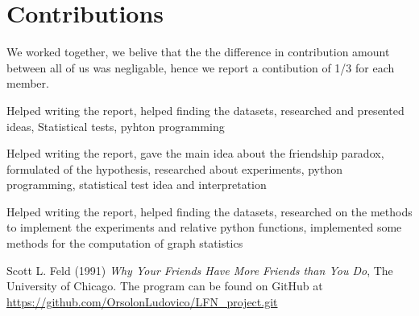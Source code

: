 \documentclass{article}
\begin{document}
\section*{Contributions}
We worked together, we belive that the the difference in contribution amount between all of us was negligable, hence we report a contibution of 1/3 for each member.
\begin{description}[font=\normalfont\itshape]
    \item[Lavorati Ippolito:] Helped writing the report, helped finding the datasets, researched and presented ideas, Statistical tests, pyhton programming
    \item[Orsolon Ludovico:] Helped writing the report, gave the main idea about the friendship paradox, formulated of the hypothesis, researched about experiments, python programming, statistical test idea and interpretation
    \item[Stefani Patrizia:] Helped writing the report, helped finding the datasets, researched on the methods to implement the experiments and relative python functions, implemented some methods for the computation of graph statistics
\end{description}
\begin{thebibliography}{9}
Scott L. Feld (1991) \emph{Why Your Friends Have More Friends
than You Do}, The University of Chicago.
The program can be found on GitHub at \url{https://github.com/OrsolonLudovico/LFN_project.git}
\end{thebibliography}
\end{document}
